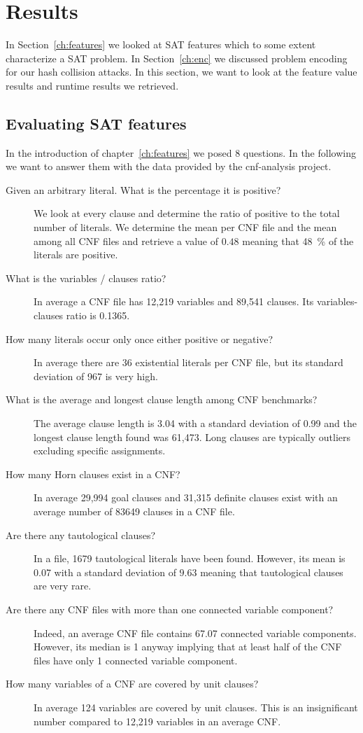 \renewcommand*\chappic{img/megosat.pdf}
\renewcommand*\chapquote{}
\renewcommand*\chapquotesrc{}
\chapter{Results}
\label{ch:results}
%
In Section~\ref{ch:features} we looked at SAT features which to some extent characterize
a SAT problem. In Section~\ref{ch:enc} we discussed problem encoding for our hash collision
attacks. In this section, we want to look at the feature value results and runtime results
we retrieved.

\section{Evaluating SAT features}
\label{sec:results-features}

In the introduction of chapter~\ref{ch:features} we posed 8 questions.
In the following we want to answer them with the data provided by the
cnf-analysis project.

\begin{description}
\item[Given an arbitrary literal. What is the percentage it is positive?]
  We look at every clause and determine the ratio of positive to the total number of literals.
  We determine the mean per CNF file and the mean among all CNF files
  and retrieve a value of $0.48$ meaning that 48~\% of the literals are positive.
\item[What is the variables / clauses ratio?]
  In average a CNF file has 12,219 variables and 89,541 clauses.
  Its variables-clauses ratio is 0.1365.
\item[How many literals occur only once either positive or negative?]
  In average there are 36 existential literals per CNF file,
  but its standard deviation of 967 is very high.
\item[What is the average and longest clause length among CNF benchmarks?]
  The average clause length is 3.04 with a standard deviation of 0.99
  and the longest clause length found was 61,473. Long clauses are typically
  outliers excluding specific assignments.
\item[How many Horn clauses exist in a CNF?]
  In average 29,994 goal clauses and 31,315 definite clauses exist
  with an average number of 83649 clauses in a CNF file.
\item[Are there any tautological clauses?]
  In a file, 1679 tautological literals have been found. However,
  its mean is 0.07 with a standard deviation of $9.63$ meaning that tautological
  clauses are very rare.
\item[Are there any CNF files with more than one connected variable component?]
  Indeed, an average CNF file contains 67.07 connected variable components.
  However, its median is 1 anyway implying that at least half of the CNF files
  have only 1 connected variable component.
\item[How many variables of a CNF are covered by unit clauses?]
  In average 124 variables are covered by unit clauses. This is an insignificant
  number compared to 12,219 variables in an average CNF.
\end{description}

